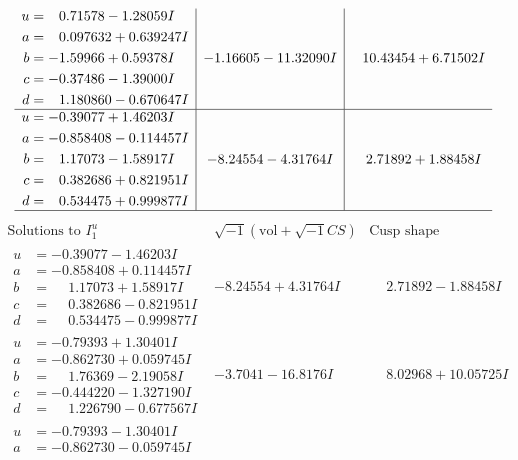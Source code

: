 \documentclass[1p]{elsarticle_modified}
\theoremstyle{definition}
\newcommand{\I}{\sqrt{-1}}
\begin{document}
$$\begin{array}{c|c|c}
\begin{aligned}
u &= \phantom{-}0.71578 - 1.28059 I \\
a &= \phantom{-}0.097632 + 0.639247 I \\
b &= -1.59966 + 0.59378 I \\
c &= -0.37486 - 1.39000 I \\
d &= \phantom{-}1.180860 - 0.670647 I\end{aligned}
 & -1.16605 - 11.32090 I & \phantom{-}10.43454 + 6.71502 I \\ \hline\begin{aligned}
u &= -0.39077 + 1.46203 I \\
a &= -0.858408 - 0.114457 I \\
b &= \phantom{-}1.17073 - 1.58917 I \\
c &= \phantom{-}0.382686 + 0.821951 I \\
d &= \phantom{-}0.534475 + 0.999877 I\end{aligned}
 & -8.24554 - 4.31764 I & \phantom{-}2.71892 + 1.88458 I\\
 \hline 
 \end{array}$$\newpage$$\begin{array}{c|c|c}  
\text{Solutions to }I^u_{1}& \I (\text{vol} + \sqrt{-1}CS) & \text{Cusp shape}\\
 \hline 
\begin{aligned}
u &= -0.39077 - 1.46203 I \\
a &= -0.858408 + 0.114457 I \\
b &= \phantom{-}1.17073 + 1.58917 I \\
c &= \phantom{-}0.382686 - 0.821951 I \\
d &= \phantom{-}0.534475 - 0.999877 I\end{aligned}
 & -8.24554 + 4.31764 I & \phantom{-}2.71892 - 1.88458 I \\ \hline\begin{aligned}
u &= -0.79393 + 1.30401 I \\
a &= -0.862730 + 0.059745 I \\
b &= \phantom{-}1.76369 - 2.19058 I \\
c &= -0.444220 - 1.327190 I \\
d &= \phantom{-}1.226790 - 0.677567 I\end{aligned}
 & -3.7041 - 16.8176 I & \phantom{-}8.02968 + 10.05725 I \\ \hline\begin{aligned}
u &= -0.79393 - 1.30401 I \\
a &= -0.862730 - 0.059745 I \\

\end{aligned}
\end{array}$$
\end{document}

